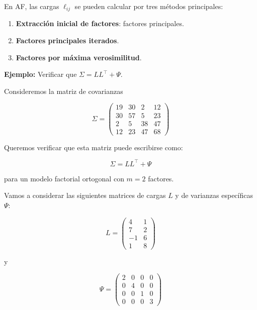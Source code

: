 \documentclass[
]{book}
\providecommand{\tightlist}{%
  \setlength{\itemsep}{0pt}\setlength{\parskip}{0pt}}
\begin{document}
En AF, las cargas \(\ell_{ij}\) se pueden calcular por tres métodos principales:

\begin{enumerate}
\def\labelenumi{\arabic{enumi}.}
\tightlist
\item
  \textbf{Extracción inicial de factores}: factores principales.
\item
  \textbf{Factores principales iterados}.
\item
  \textbf{Factores por máxima verosimilitud}.
\end{enumerate}

\textbf{Ejemplo:} Verificar que \(\Sigma= LL^\top+\Psi\).

Consideremos la matriz de covarianzas

\[
\Sigma =
\begin{pmatrix}
19 & 30 &  2 & 12 \\
30 & 57 &  5 & 23 \\
 2 &  5 & 38 & 47 \\
12 & 23 & 47 & 68
\end{pmatrix}
\]

Queremos verificar que esta matriz puede escribirse como:

\[\Sigma= LL^\top+\Psi\]

para un modelo factorial ortogonal con \(m=2\) factores.

Vamos a considerar las siguientes matrices de cargas \(L\) y de varianzas específicas \(\Psi\):

\[
L =
\begin{pmatrix}
 4 &  1 \\
 7 &  2 \\
-1 &  6 \\
 1 &  8
\end{pmatrix}
\]

y

\[
\Psi =
\begin{pmatrix}
2 & 0 & 0 & 0 \\
0 & 4 & 0 & 0 \\
0 & 0 & 1 & 0 \\
0 & 0 & 0 & 3
\end{pmatrix}
\]
\end{document}
